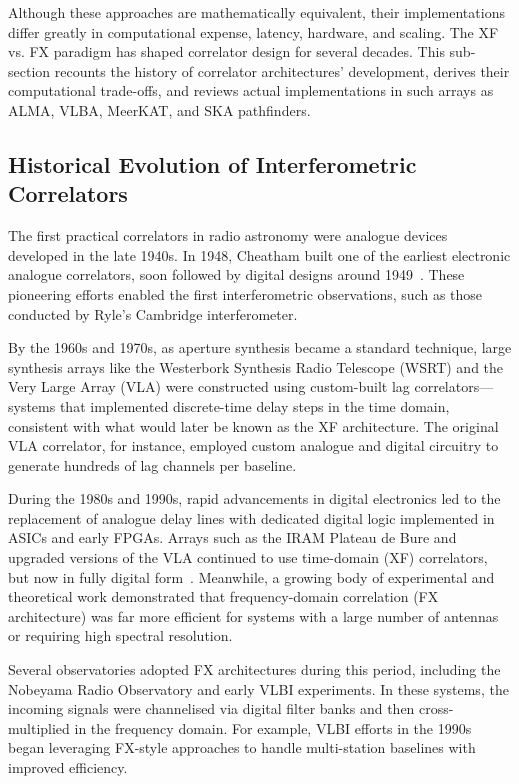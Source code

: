 Although these approaches are mathematically equivalent, their implementations differ greatly in computational expense, latency, hardware, and scaling. The XF vs. FX paradigm has shaped correlator design for several decades. This sub-section recounts the history of correlator architectures' development, derives their computational trade-offs, and reviews actual implementations in such arrays as ALMA, VLBA, MeerKAT, and SKA pathfinders.

    \subsection{Historical Evolution of Interferometric Correlators}
    The first practical correlators in radio astronomy were analogue devices developed in the late 1940s. In 1948, Cheatham built one of the earliest electronic analogue correlators, soon followed by digital designs around 1949~\cite{Thompson2001}. These pioneering efforts enabled the first interferometric observations, such as those conducted by Ryle’s Cambridge interferometer.

    By the 1960s and 1970s, as aperture synthesis became a standard technique, large synthesis arrays like the Westerbork Synthesis Radio Telescope (WSRT) and the Very Large Array (VLA) were constructed using custom-built lag correlators—systems that implemented discrete-time delay steps in the time domain, consistent with what would later be known as the XF architecture. The original VLA correlator, for instance, employed custom analogue and digital circuitry to generate hundreds of lag channels per baseline.

    During the 1980s and 1990s, rapid advancements in digital electronics led to the replacement of analogue delay lines with dedicated digital logic implemented in ASICs and early FPGAs. Arrays such as the IRAM Plateau de Bure and upgraded versions of the VLA continued to use time-domain (XF) correlators, but now in fully digital form~\cite{Escoffier2007}. Meanwhile, a growing body of experimental and theoretical work demonstrated that frequency-domain correlation (FX architecture) was far more efficient for systems with a large number of antennas or requiring high spectral resolution.

    Several observatories adopted FX architectures during this period, including the Nobeyama Radio Observatory and early VLBI experiments. In these systems, the incoming signals were channelised via digital filter banks and then cross-multiplied in the frequency domain. For example, VLBI efforts in the 1990s began leveraging FX-style approaches to handle multi-station baselines with improved efficiency.

